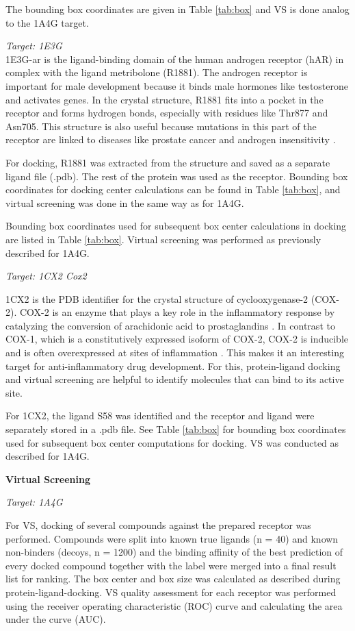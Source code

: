 \documentclass[a4paper,10pt]{article}
\begin{document}
The bounding box coordinates are given in Table \ref{tab:box} and VS is done analog to the 1A4G target.

\textit{Target: 1E3G} \\
1E3G-ar is the ligand-binding domain of the human androgen receptor (hAR) in complex with the ligand metribolone (R1881). The androgen receptor is important for male development because it binds male hormones like testosterone and activates genes. In the crystal structure, R1881 fits into a pocket in the receptor and forms hydrogen bonds, especially with residues like Thr877 and Asn705. This structure is also useful because mutations in this part of the receptor are linked to diseases like prostate cancer and androgen insensitivity \cite{1E3G}.

For docking, R1881 was extracted from the structure and saved as a separate ligand file (.pdb). The rest of the protein was used as the receptor. Bounding box coordinates for docking center calculations can be found in Table \ref{tab:box}, and virtual screening was done in the same way as for 1A4G.

Bounding box coordinates used for subsequent box center calculations in docking are listed in Table \ref{tab:box}. Virtual screening was performed as previously described for 1A4G.

\textit{Target: 1CX2 Cox2}

1CX2 is the PDB identifier for the crystal structure of cyclooxygenase-2 (COX-2). COX-2 is an enzyme that plays a key role in the inflammatory response by catalyzing the conversion of arachidonic acid to prostaglandins \cite{1CX2}. In contrast to COX-1, which is a constitutively expressed isoform of COX-2, COX-2 is inducible and is often overexpressed at sites of inflammation \cite{1CX2_2}. This makes it an interesting target for anti-inflammatory drug development. For this, protein-ligand docking and virtual screening are helpful to identify molecules that can bind to its active site. 

For 1CX2, the ligand S58 was identified and the receptor and ligand were separately stored in a .pdb file. See Table \ref{tab:box} for bounding box coordinates used for subsequent box center computations for docking. VS was conducted as described for 1A4G.





\textbf{Virtual Screening}

\textit{Target: 1A4G}

For VS, docking of several compounds against the prepared receptor was performed. Compounds were split into known true ligands (n = 40) and known non-binders (decoys, n = 1200) and the binding affinity of the best prediction of every docked compound together with the label were merged into a final result list for ranking. The box center and box size was calculated as described during protein-ligand-docking.
VS quality assessment for each receptor was performed using the receiver operating characteristic (ROC) curve and calculating the area under the curve (AUC).
\end{document}
